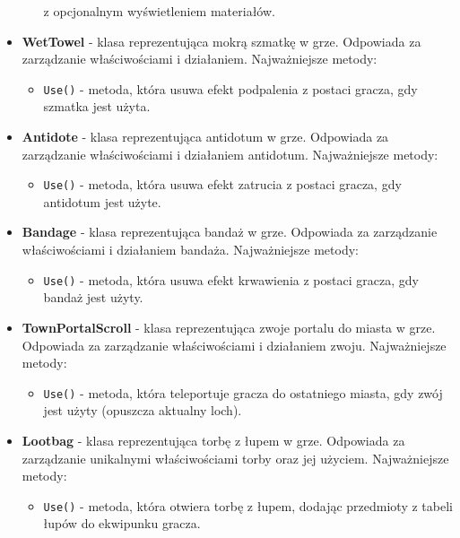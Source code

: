 \begin{itemize}
\begin{itemize}
                z opcjonalnym wyświetleniem materiałów.
            \end{itemize}
            \item \textbf{WetTowel} - klasa reprezentująca mokrą szmatkę w grze. 
            Odpowiada za zarządzanie właściwościami i działaniem. Najważniejsze metody:
                \begin{itemize}
                    \item \texttt{Use()} - metoda, która usuwa efekt podpalenia z postaci gracza, gdy szmatka jest użyta.
                \end{itemize}
            \item \textbf{Antidote} - klasa reprezentująca antidotum w grze. 
            Odpowiada za zarządzanie właściwościami i działaniem antidotum. Najważniejsze metody:
                \begin{itemize}
                    \item \texttt{Use()} - metoda, która usuwa efekt zatrucia z postaci gracza, gdy antidotum jest użyte.
                \end{itemize}
            \item \textbf{Bandage} - klasa reprezentująca bandaż w grze. 
            Odpowiada za zarządzanie właściwościami i działaniem bandaża. Najważniejsze metody:
                \begin{itemize}
                    \item \texttt{Use()} - metoda, która usuwa efekt krwawienia z postaci gracza, gdy bandaż jest użyty.
                \end{itemize}
            \item \textbf{TownPortalScroll} - klasa reprezentująca zwoje portalu do miasta w grze. 
            Odpowiada za zarządzanie właściwościami i działaniem zwoju. Najważniejsze metody:
                \begin{itemize}
                    \item \texttt{Use()} - metoda, która teleportuje gracza do ostatniego miasta, gdy zwój jest użyty (opuszcza aktualny loch).
                \end{itemize}
            \item \textbf{Lootbag} - klasa reprezentująca torbę z łupem w grze. 
            Odpowiada za zarządzanie unikalnymi właściwościami torby oraz jej użyciem. Najważniejsze metody:
                \begin{itemize}
                    \item \texttt{Use()} - metoda, która otwiera torbę z łupem, dodając przedmioty z tabeli łupów do ekwipunku gracza. 

\end{itemize}
\end{itemize}
